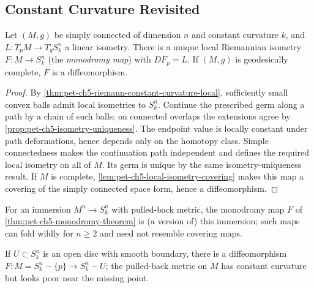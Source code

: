 \subsection{Constant Curvature Revisited}

\begin{theorem}
  \label{thm:pet-ch5-monodromy-theorem}

  Let $(M,g)$ be simply connected of dimension $n$ and constant curvature $k$, and
  $L:T_pM\to T_qS^n_k$ a linear isometry. There is a unique local Riemannian
  isometry $F:M\to S^n_k$ (the \emph{monodromy map}) with $DF_p=L$. If $(M,g)$ is
  geodesically complete, $F$ is a diffeomorphism.
\end{theorem}
\begin{proof}
  \sketch
  By \cref{thm:pet-ch5-riemann-constant-curvature-local}, sufficiently small convex
  balls admit local isometries to $S_k^n$.  Continue the prescribed germ along a
  path by a chain of such balls; on connected overlaps the extensions agree by
  \cref{prop:pet-ch5-isometry-uniqueness}.  The endpoint value is locally constant
  under path deformations, hence depends only on the homotopy class.  Simple
  connectedness makes the continuation path independent and defines the required
  local isometry on all of $M$.  Its germ is unique by the same isometry-uniqueness
  result.  If $M$ is complete, \cref{lem:pet-ch5-local-isometry-covering} makes this
  map a covering of the simply connected space form, hence a diffeomorphism.
\end{proof}

\begin{example}
  \label{ex:pet-ch5-immersion-monodromy}

  For an immersion $M^n\to S^n_k$ with pulled-back metric, the monodromy map $F$ of
  \cref{thm:pet-ch5-monodromy-theorem} is (a version of) this immersion; such maps
  can fold wildly for $n\ge2$ and need not resemble covering maps.
\end{example}

\begin{example}
  \label{ex:pet-ch5-folding-immersion}

  If $U\subset S^n_k$ is an open disc with smooth boundary, there is a
  diffeomorphism $F:M=S^n_k-\{p\}\to S^n_k-U$; the pulled-back metric on $M$ has
  constant curvature but looks poor near the missing point.
\end{example}

